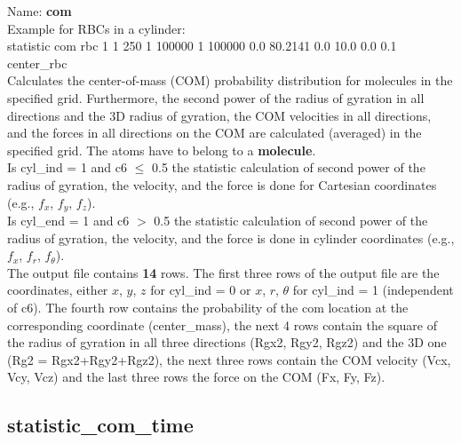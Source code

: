Name: {\bfseries com}\\[2ex]
Example for RBCs in a cylinder:\\[0.5ex]
statistic       com rbc 1 1 250 1 100000 1 100000 0.0 80.2141 0.0 10.0 0.0 0.1 center\_rbc
\\[2ex]
Calculates the center-of-mass (COM) probability distribution for molecules in the specified grid.
Furthermore, the second power of the radius of gyration in all directions and the 3D radius of gyration, the COM velocities in all directions, and the forces in all directions on the COM are calculated (averaged) in the specified grid.
The atoms have to belong to a \textbf{molecule}.
\\[2ex]
Is cyl\_ind = 1 and c6 $\le$ 0.5 the statistic calculation of second power of the radius of gyration, the velocity, and the force is done for Cartesian coordinates (e.g., $f_x$, $f_y$, $f_z$).\\
Is cyl\_end = 1 and c6 $>$ 0.5 the statistic calculation of second power of the radius of gyration, the velocity, and the force is done in cylinder coordinates (e.g., $f_x$, $f_r$, $f_{\theta}$).
\\[2ex]
The output file contains {\bfseries 14} rows.
The first three rows of the output file are the coordinates, either $x$, $y$, $z$ for cyl\_ind = 0 or $x$, $r$, $\theta$ for cyl\_ind = 1 (independent of c6).
The fourth row contains the probability of the com location at the corresponding coordinate (center\_mass), the next 4 rows contain the square of the radius of gyration in all three directions (Rgx2, Rgy2, Rgz2) and the 3D one (Rg2 = Rgx2+Rgy2+Rgz2), the next three rows contain the COM velocity (Vcx, Vcy, Vcz) and the last three rows the force on the COM (Fx, Fy, Fz).


\subsection{statistic\_com\_time}

